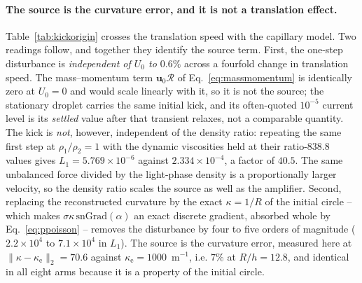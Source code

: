 \documentclass[preprint,3p,11pt]{elsarticle}
\newcommand{\uvec}{\mathbf{u}}
\begin{document}
\paragraph{The source is the curvature error, and it is not a translation effect.}
Table~\ref{tab:kickorigin} crosses the translation speed with the capillary model. Two
readings follow, and together they identify the source term. First, the one-step
disturbance is \emph{independent of $U_0$ to $0.6\%$} across a fourfold change in
translation speed. The mass--momentum term $\uvec_0\mathcal R$ of
Eq.~\eqref{eq:massmomentum} is identically zero at $U_0=0$ and would scale linearly with
it, so it is not the source; the stationary droplet carries the same initial kick, and its
often-quoted $10^{-5}$ current level is its \emph{settled} value after that transient
relaxes, not a comparable quantity. The kick is \emph{not}, however, independent of the
density ratio: repeating the same first step at $\rho_1/\rho_2=1$ with the dynamic
viscosities held at their ratio-$838.8$ values gives $L_1=5.769\times10^{-6}$ against
$2.334\times10^{-4}$, a factor of $40.5$. The same unbalanced force divided by the
light-phase density is a proportionally larger velocity, so the density ratio scales the
source as well as the amplifier. Second, replacing the reconstructed curvature by the
exact $\kappa=1/R$ of the initial circle -- which makes
$\sigma\kappa\,\mathrm{snGrad}(\alpha)$ an exact discrete gradient, absorbed whole by
Eq.~\eqref{eq:ppoisson} -- removes the disturbance by four to five orders of magnitude
($2.2\times10^{4}$ to $7.1\times10^{4}$ in $L_1$). The
source is the curvature error, measured here at $\lVert\kappa-\kappa_{\mathrm
e}\rVert_{2}=70.6$ against $\kappa_{\mathrm e}=1000$~m$^{-1}$, i.e. $7\%$ at $R/h=12.8$,
and identical in all eight arms because it is a property of the initial circle.
\end{document}
